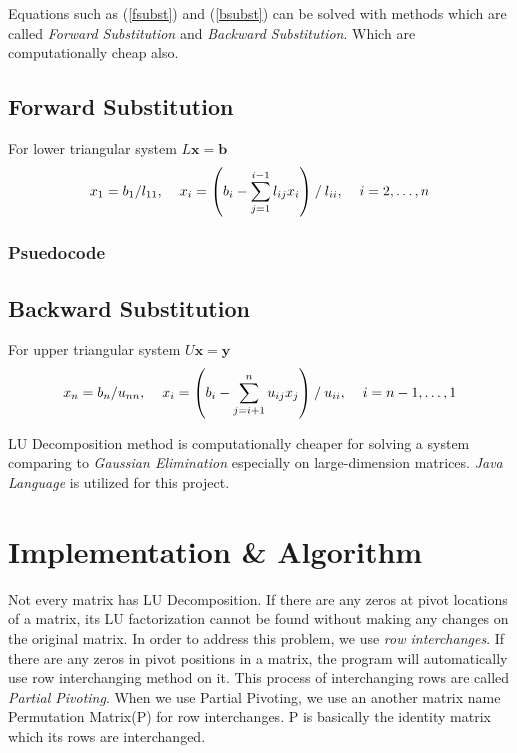\documentclass{article}
\newcommand{\bx}{{\mathbf x}}
\newcommand{\by}{{\mathbf y}}
\newcommand{\bb}{{\mathbf b}}
\begin{document}
Equations such as (\ref{fsubst}) and (\ref{bsubst}) can be solved with methods which are called \textit{Forward Substitution} and \textit{Backward Substitution}. Which are computationally cheap also.
\subsection{Forward Substitution}
For lower triangular system $L{\bx}={\bb}$
\begin{equation}
  x_1 = b_1/l_{11},\hspace{4mm} x_i = \left( b_i - \sum_{j=1}^{i-1}l_{ij}x_i\right) \mathbin{/} l_{ii}, \hspace{4mm} i =2,\ldots,n
\end{equation}
\subsubsection{Psuedocode}

\subsection{Backward Substitution}
For upper triangular system $U{\bx}={\by}$
\begin{equation}
  x_n = b_n/u_{nn},\hspace{4mm} x_i = \left( b_i - \sum_{j=i+1}^{n}u_{ij}x_j\right) \mathbin{/} u_{ii}, \hspace{4mm} i =n -1,\ldots,1
\end{equation}

LU Decomposition method is computationally cheaper for solving a system comparing to \textit{Gaussian Elimination} especially on large-dimension matrices. 	\textit{Java Language} is utilized for this project. \\
	\section{Implementation \& Algorithm}
	
Not every matrix has LU Decomposition. If there are any zeros at pivot locations of a matrix, its LU factorization cannot be found without making any changes on the original matrix. In order to address this problem, we use \textit{row interchanges}. If there are any zeros in pivot positions in a matrix, the program will automatically use row interchanging method on it. This process of interchanging rows are called \textit{Partial Pivoting}. When we use Partial Pivoting, we use an another matrix name Permutation Matrix(P) for row interchanges. P is basically the identity matrix which its rows are interchanged. 
\end{document}
